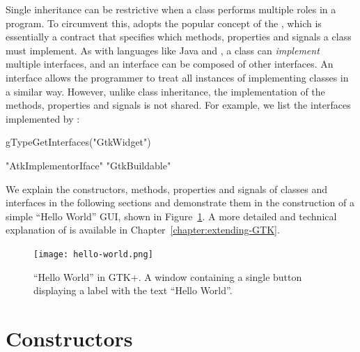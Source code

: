 Single inheritance can be restrictive when a class performs multiple
roles in a program. To circumvent this,  adopts the popular
concept of the , which is essentially a contract
that specifies which methods, properties and signals a class must
implement. As with languages like Java and , a class can
\textit{implement} multiple interfaces, and an interface can be
composed of other interfaces. An interface allows the programmer to
treat all instances of implementing classes in a similar way. However,
unlike class inheritance, the implementation of the methods,
properties and signals is not shared. For example, we list the
interfaces implemented by :
\begin{Schunk}
\begin{Sinput}
 gTypeGetInterfaces("GtkWidget")
\end{Sinput}
\begin{Soutput}
[1] "AtkImplementorIface" "GtkBuildable"       
\end{Soutput}
\end{Schunk}

We explain the constructors, methods, properties and signals of
classes and interfaces in the following sections and demonstrate them
in the construction of a simple ``Hello World'' GUI, shown in
Figure~\ref{fig:hello-world}. A more detailed and technical
explanation of  is available in
Chapter~\ref{chapter:extending-GTK}.

\begin{figure}[h!tbp]
  \begin{center}
    \texttt{[image: hello-world.png]}
    \caption{\label{fig:hello-world}``Hello World'' in GTK+. 
      A window containing a single button displaying a label with the text
      ``Hello World''.}
  \end{center}
\end{figure}

\section{Constructors}

